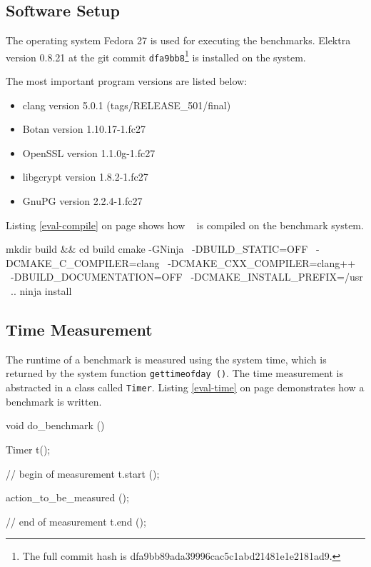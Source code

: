   \subsection{Software Setup}

The operating system Fedora 27 is used for executing the benchmarks.
Elektra version 0.8.21 at the git commit \texttt{dfa9bb8}\footnote{The full commit hash is dfa9bb89ada39996cac5c1abd21481e1e2181ad9.} is installed on the system.

The most important program versions are listed below:

\begin{itemize}
  \item clang version 5.0.1 (tags/RELEASE\_501/final)
  \item Botan version 1.10.17-1.fc27
  \item OpenSSL version 1.1.0g-1.fc27
  \item libgcrypt version 1.8.2-1.fc27
  \item GnuPG version 2.2.4-1.fc27
\end{itemize}

Listing \ref{eval-compile} on page \pageref{eval-compile} shows how \elektra ~ is compiled on the benchmark system.

\begin{code}[label=eval-compile,language=bash,caption={Elektra compile options for the benchmarks}]
mkdir build && cd build
cmake -GNinja \
    -DBUILD_STATIC=OFF \
    -DCMAKE_C_COMPILER=clang \
    -DCMAKE_CXX_COMPILER=clang++ \
    -DBUILD_DOCUMENTATION=OFF \
    -DCMAKE_INSTALL_PREFIX=/usr \
    ..
ninja install
\end{code}

  \subsection{Time Measurement}

The runtime of a benchmark is measured using the system time, which is returned by the system function \texttt{gettimeofday ()}.
The time measurement is abstracted in a class called \texttt{Timer}.
Listing \ref{eval-time} on page \pageref{eval-time} demonstrates how a benchmark is written.

\begin{code}[label=eval-time,language=C,caption={Time measurement for the benchmarks}]
void do_benchmark ()
{
  Timer t();

  // begin of measurement
  t.start ();

  action_to_be_measured ();

  // end of measurement
  t.end ();
}
\end{code}


